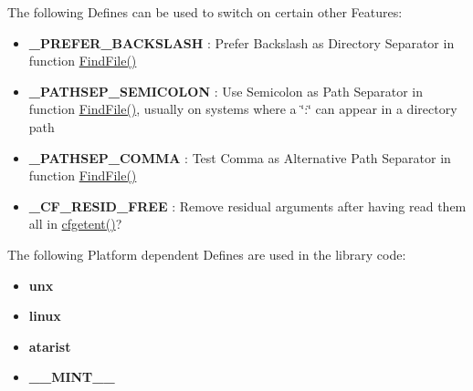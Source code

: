 The following Defines can be used to switch on certain other Features:

\begin{itemize}
\item {\bf \_\-PREFER\_\-BACKSLASH} : Prefer Backslash as Directory Separator in function \hyperlink{group__utilities_g4e4e8f9a03b7f3598b5efd199b9a67c9}{FindFile()}\item {\bf \_\-PATHSEP\_\-SEMICOLON} : Use Semicolon as Path Separator in function \hyperlink{group__utilities_g4e4e8f9a03b7f3598b5efd199b9a67c9}{FindFile()}, usually on systems where a \char`\"{}:\char`\"{} can appear in a directory path\item {\bf \_\-PATHSEP\_\-COMMA} : Test Comma as Alternative Path Separator in function \hyperlink{group__utilities_g4e4e8f9a03b7f3598b5efd199b9a67c9}{FindFile()}\item {\bf \_\-CF\_\-RESID\_\-FREE} : Remove residual arguments after having read them all in \hyperlink{group__retrieval_g872f83b13a8f722176f5e299f2a42e0f}{cfgetent()}?\end{itemize}


The following Platform dependent Defines are used in the library code:

\begin{itemize}
\item {\bf unx} \item {\bf linux} \item {\bf atarist} \item {\bf \_\-\_\-MINT\_\-\_\-} \end{itemize}
